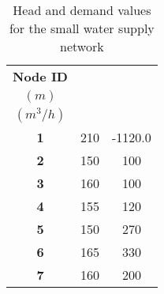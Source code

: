 \begin{table}[H]
	\centering
	\caption{Head and demand values for the small water supply network}
	\label{table:small_WSN_nodes}
	\small
	\begin{tabular}{ccc}
    	\hline
    	\textbf{Node ID} & \Centerstack{\textbf{Head} \\ $(m)$} & \Centerstack{\textbf{Demand} \\ $(m^3/h)$} \\ 
            \hline
    	\textbf{1} & 210 & -1120.0 \\
    	\textbf{2} & 150 & 100 \\
    	\textbf{3} & 160 & 100 \\
    	\textbf{4} & 155 & 120 \\
            \textbf{5} & 150 & 270 \\
            \textbf{6} & 165 & 330 \\
            \textbf{7} & 160 & 200 \\
    	\hline
	\end{tabular}
\end{table}